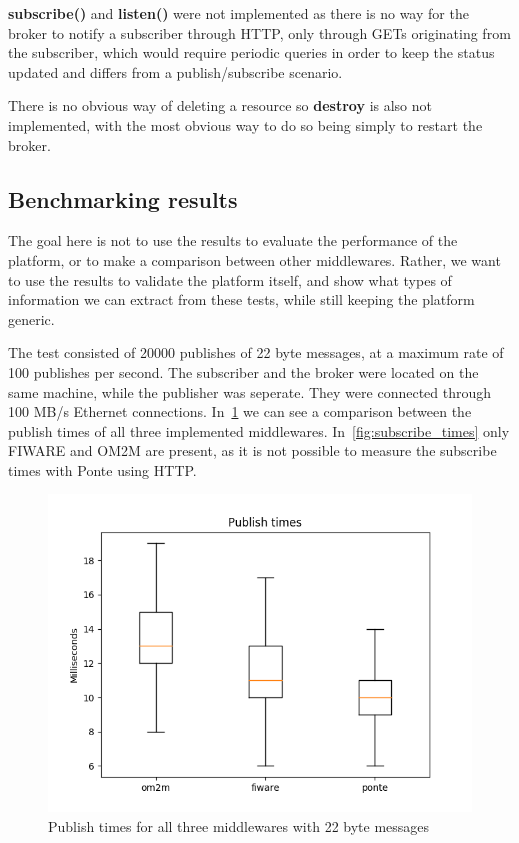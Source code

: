 \documentclass[conference]{IEEEtran}
\begin{document}
\textbf{subscribe()} and \textbf{listen()} were not implemented as there is no way for the broker to notify a subscriber through HTTP, only through GETs originating from the subscriber, which would require periodic queries in order to keep the status updated and differs from a publish/subscribe scenario.

There is no obvious way of deleting a resource so \textbf{destroy} is also not implemented, with the most obvious way to do so being simply to restart the broker. 

\subsection{Benchmarking results}

The goal here is not to use the results to evaluate the performance of the platform, or to make a comparison between other middlewares. Rather, we want to use the results to validate the platform itself, and show what types of information we can extract from these tests, while still keeping the platform generic.

The test consisted of 20000 publishes of 22 byte messages, at a maximum rate of 100 publishes per second. The subscriber and the broker were located on the same machine, while the publisher was seperate. They were connected through 100 MB/s Ethernet connections. In~\ref{fig:publish_times} we can see a comparison between the publish times of all three implemented middlewares. In~\ref{fig:subscribe_times} only FIWARE and OM2M are present, as it is not possible to measure the subscribe times with Ponte using HTTP. 

\begin{figure}[htbp!]
  \centering
  \includegraphics[width=\columnwidth]{figures/om2m_fiware_ponte_publish_times.png}
  \caption{Publish times for all three middlewares with 22 byte messages}
  \label{fig:publish_times}
\end{figure}
\end{document}
